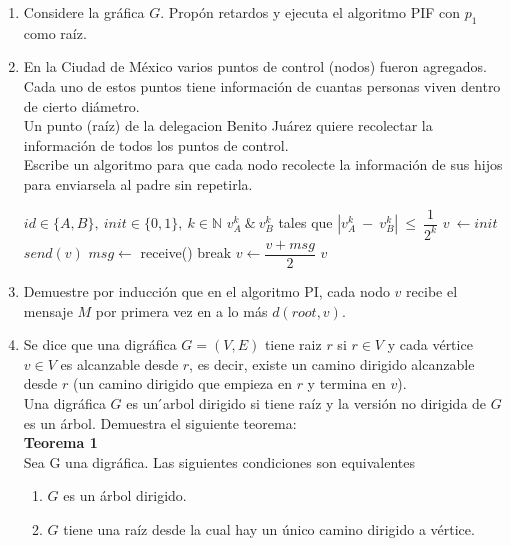\documentclass[12pt,a4paper]{report}
\begin{document}
\begin{enumerate}
	\item {
		Considere la gráfica $G$. Propón retardos y ejecuta el algoritmo PIF con
		$p_1$ como raíz.\\
	}

	\item {
		En la Ciudad de México varios puntos de control (nodos) fueron agregados.\\
		Cada uno de estos puntos tiene información de cuantas personas viven
		dentro de cierto diámetro. \\
		Un punto (raíz) de la delegacion Benito Juárez quiere recolectar la
		información de todos los puntos de control. \\
		Escribe un algoritmo para que cada nodo recolecte la información de sus
		hijos para enviarsela al padre sin repetirla.\\

			\begin{algorithmic}[1]
				\Require $id \in \{A,B\},\ init \in \{0, 1\},\ k \in \mathbb{N}$
				\Ensure $v_A^k\ \& \ v_B^k$ tales que $|v_A^k\ - \ v_B^k|\ \leq\ \dfrac{1}
					{2^k}$
					\State $v\ \leftarrow init$
						\State $send(v)$
						\State $msg \leftarrow$ receive()
								\State break
							\Else
								\State $v \leftarrow \dfrac{v + msg}{2}$
							\EndIf
						\EndIf
					\EndFor
					\State \Return$v$
				\EndFunction
			\end{algorithmic}
		}

	\item{
		Demuestre por inducción que en el algoritmo PI, cada nodo $v$ recibe el
		mensaje $M$ por primera vez en a lo más $d(root, v)$.\\
	}
	\item{
		Se dice que una digráfica $G = (V, E)$ tiene raiz $r$ si $r \in V$ y cada
		vértice $v \in V$ es alcanzable desde $r$, es decir, existe un camino
		dirigido alcanzable desde $r$ (un camino dirigido que empieza en $r$ y
		termina en $v$).\\
		Una digráfica $G$ es un  ́arbol dirigido si tiene raíz y la versión no dirigida
		de $G$ es un árbol. Demuestra el siguiente teorema:\\

		\textbf{Teorema 1}\\
		Sea G una digráfica. Las siguientes condiciones son equivalentes
		\begin{enumerate} [label = \alph*)]
			\item {
				$G$ es un árbol dirigido.\\
			}
			\item {
				$G$ tiene una raíz desde la cual hay un único camino dirigido a
				vértice.\\
			}


\end{enumerate}}
\end{enumerate}
\end{document}
